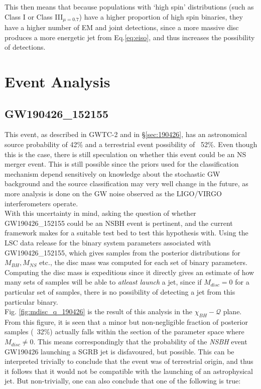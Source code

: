     This then means that because populations with `high spin' distributions (such as
    Class I or Class III$_{\mu = 0.7}$) have a higher proportion of high spin binaries,
    they have a higher number of EM and joint detections, since a more massive disc
    produces a more energetic jet from Eq.\ref{eq:eiso}, and thus increases the
    possibility of detections.

\section{Event Analysis}\label{sec:event_analysis}

    \subsection{GW190426\_152155}\label{ssec:nsbh_190426}

        This event, as described in GWTC-2 and in \S\ref{sec:190426}, has an
        astronomical source probability of 42\% and a terrestrial event possibility of
        ~52\%. Even though this is the case, there is still speculation on whether this
        event could be an NS merger event.  This is still possible since the priors used
        for the classification mechanism depend sensitively on knowledge about the
        stochastic GW background and the source classification may very well change in
        the future, as more analysis is done on the GW noise observed as the LIGO/VIRGO
        interferometers operate.\\
        With this uncertainty in mind, asking the question of whether GW190426\_152155
        could be an NSBH event is pertinent, and the current framework makes for a
        suitable test bed to test this hypothesis with. Using the LSC data release for
        the binary system parameters associated with GW190426\_152155, which gives
        samples from the posterior distributions for $M_{BH}, M_{NS}$ etc., the disc
        mass was computed for each set of binary parameters. Computing the disc mass is
        expeditious since it directly gives an estimate of how many sets of samples will
        be able to \textit{atleast launch} a jet, since if $M_{disc} = 0$ for a
        particular set of samples, there is no possibility of detecting a jet from this
        particular binary.\\
        Fig. \ref{fig:mdisc_q_190426} is the result of this analysis in the
        $\chi_{BH}-\mathcal{Q}$ plane. From this figure, it is seen that a minor but
        non-negligible fraction of posterior samples (~32\%) actually falls within the
        section of the parameter space where $M_{disc} \neq 0$. This means
        correspondingly that the probability of the \emph{NSBH} event GW190426 launching
        a SGRB jet is disfavoured, but possible. This can be interpreted trivially to
        conclude that the event was of terrestrial origin, and thus it follows that it
        would not be compatible with the launching of an astrophysical jet. But
        non-trivially, one can also conclude that one of the following is true:

